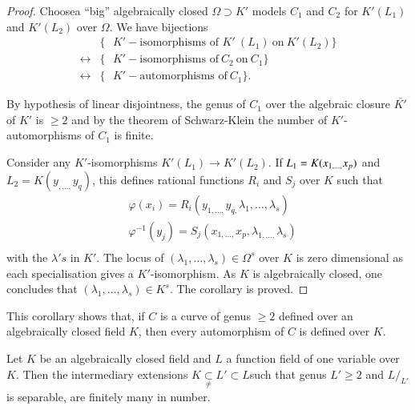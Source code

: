 \begin{proof}%
  Choose\pageoriginale a ``big'' algebraically closed $\Omega \supset K'$ models
  $C_1 $ and $C_2 $ for $K'(L_1)$ and $K'(L_2)$ over $\Omega$. We have
  bijections  
  \begin{align*}
    &\Big\{ \text{ $K'-$isomorphisms of $K'$} ~(L_1) ~\text{on}~
    K'(L_2) \Big\} \\ 
    \leftrightarrow & \Big\{ \text{ $K'-$isomorphisms of}~ C_2 ~\text{on}~ C_1
    \Big\} \\ 
    \leftrightarrow & \Big\{ \text{ $K'-$automorphisms of}~ C_1\Big\}.
  \end{align*}
  
  By hypothesis of linear disjointness, the genus of $C_1$ over the
  algebraic closure $\bar{K'}$ of $K'$ is $\ge 2$ and by the theorem
  of Schwarz-Klein the number of $K'$-automorphisms of $C_1$ is
  finite. 
		
  Consider any $K'$-isomorphisms $K' (L_1)\rightarrow K' (L_2)$. If
  $L_1 =\break K(x_{1,\ldots,}{ x_p})$ and $L_2 = K(y_{,\ldots,}{ y_q})$,
  this defines rational functions $R_{ i}$ and $S_{ j}$ over $K$ such
  that  
  \begin{align*}
    & \varphi(x_i) = R_i(y_{1,\ldots,}y_{q,} \lambda_1,\ldots, \lambda_s) \\
    & \varphi^{-1}(y_j) = S_j (x_{1,\ldots,}x_p, \lambda_{1,\ldots,}
    \lambda_s) \\ 
  \end{align*}	
  with the $\lambda's $ in $K'$. The locus of $( \lambda_1,\ldots,
  \lambda_s) \in \Omega^{ s}$ over $K$ is zero dimensional as each
  specialisation gives a $K'$-isomorphism. As $K$ is algebraically
  closed, one concludes that $(\lambda_1,\ldots, \lambda_ s)\in
  K^s$. The corollary is proved. 
\end{proof}

\begin{remark*}%
  This corollary shows that, if $C$ is a curve of genus $\ge 2$
  defined over an algebraically closed field $K$, then every
  automorphism of $C$ is defined over $K$. 
\end{remark*}
		
\begin{theorem*}[ (Severi)]%
  Let $K$ be an algebraically closed field and $L$ a function field of
  one variable over $K$. Then the intermediary extensions $K
  \underset{\ne}{\subset} L' \subset L$\pageoriginale such that genus $L' \ge 2 $
  and $L/_{L'}$ is separable, are finitely many in number. 
\end{theorem*}

